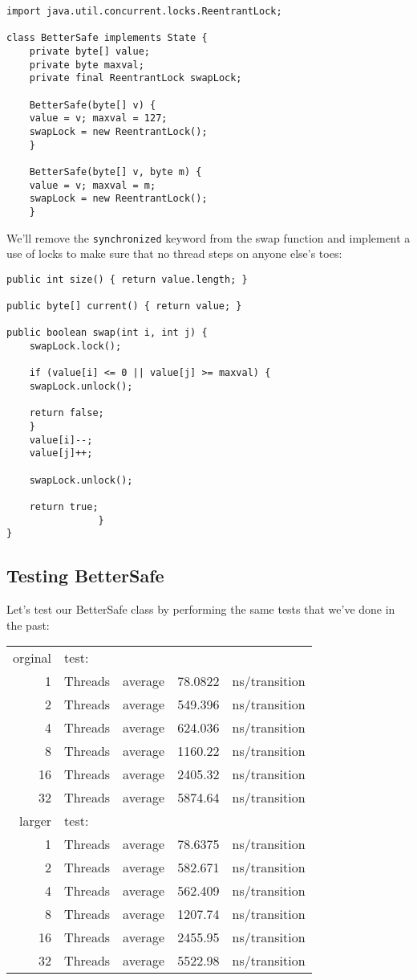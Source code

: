 \documentclass[11pt]{article}
\begin{document}
\begin{verbatim}
import java.util.concurrent.locks.ReentrantLock;

class BetterSafe implements State {
    private byte[] value;
    private byte maxval;
    private final ReentrantLock swapLock;

    BetterSafe(byte[] v) {
	value = v; maxval = 127;
	swapLock = new ReentrantLock();
    }

    BetterSafe(byte[] v, byte m) {
	value = v; maxval = m;
	swapLock = new ReentrantLock();
    }
\end{verbatim}

We'll remove the \verb~synchronized~ keyword from the swap
function and implement a use of locks to make sure that
no thread steps on anyone else's toes: 

\begin{verbatim}
public int size() { return value.length; }

public byte[] current() { return value; }

public boolean swap(int i, int j) {
    swapLock.lock();

    if (value[i] <= 0 || value[j] >= maxval) {
	swapLock.unlock();

	return false;
    }
    value[i]--;
    value[j]++;

    swapLock.unlock();

    return true;
			    }
}
\end{verbatim}
\subsection{Testing BetterSafe}
\label{sec-5-2}
Let's test our BetterSafe class by performing the same tests
that we've done in the past:

\begin{center}
\begin{tabular}{rllrl}
orginal & test: &  &  & \\
1 & Threads & average & 78.0822 & ns/transition\\
2 & Threads & average & 549.396 & ns/transition\\
4 & Threads & average & 624.036 & ns/transition\\
8 & Threads & average & 1160.22 & ns/transition\\
16 & Threads & average & 2405.32 & ns/transition\\
32 & Threads & average & 5874.64 & ns/transition\\
larger & test: &  &  & \\
1 & Threads & average & 78.6375 & ns/transition\\
2 & Threads & average & 582.671 & ns/transition\\
4 & Threads & average & 562.409 & ns/transition\\
8 & Threads & average & 1207.74 & ns/transition\\
16 & Threads & average & 2455.95 & ns/transition\\
32 & Threads & average & 5522.98 & ns/transition\\
\end{tabular}
\end{center}
\end{document}
